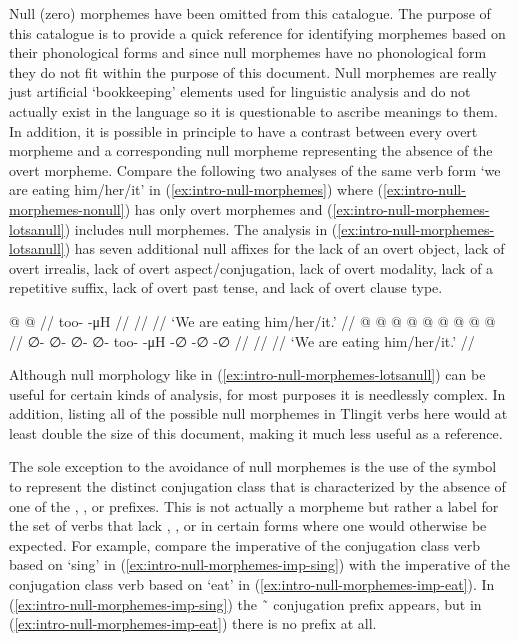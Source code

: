 Null (zero) morphemes have been omitted from this catalogue.
The purpose of this catalogue is to provide a quick reference for identifying morphemes based on their phonological forms and since null morphemes have no phonological form they do not fit within the purpose of this document.
Null morphemes are really just artificial ‘bookkeeping’ elements used for linguistic analysis and do not actually exist in the language so it is questionable to ascribe meanings to them.
In addition, it is possible in principle to have a contrast between every overt morpheme and a corresponding null morpheme representing the absence of the overt morpheme.
Compare the following two analyses of the same verb form  ‘we are eating him/her/it’ in (\ref{ex:intro-null-morphemes}) where (\ref{ex:intro-null-morphemes-nonull}) has only overt morphemes and (\ref{ex:intro-null-morphemes-lotsanull}) includes null morphemes.
The analysis in (\ref{ex:intro-null-morphemes-lotsanull}) has seven additional null affixes for the lack of an overt object, lack of overt irrealis, lack of overt aspect/conjugation, lack of overt modality, lack of a repetitive suffix, lack of overt past tense, and lack of overt clause type.

\pex\label{ex:intro-null-morphemes}%
\a\label{ex:intro-null-morphemes-nonull}%
\begingl
	\gla	{} @ {} @ {} //
	\glb	too-  -μH //
	\glc	{}\·  \· //
	\gld	{} {} {} //
	\glft	‘We are eating him/her/it.’
		//
\endgl
\a\label{ex:intro-null-morphemes-lotsanull}%
\begingl
	\gla	{} @ {} @ {} @ {} @ {} @ {} @ {} @ {} @ {} @ {} //
	\glb	∅- ∅- ∅- ∅- too-  -μH -∅ -∅ -∅ //
	\glc	{}\· \· \· \· \·
		 \· \· \· \· //
	\gld	{} {} {} {} {} {} {} {} {} {} //
	\glft	‘We are eating him/her/it.’
		//
\endgl
\xe

Although null morphology like in (\ref{ex:intro-null-morphemes-lotsanull}) can be useful for certain kinds of analysis, for most purposes it is needlessly complex.
In addition, listing all of the possible null morphemes in Tlingit verbs here would at least double the size of this document, making it much less useful as a reference.

The sole exception to the avoidance of null morphemes is the use of the symbol  to represent the distinct conjugation class that is characterized by the absence of one of the , , or  prefixes.
This  is not actually a morpheme but rather a label for the set of verbs that lack , , or  in certain forms where one would otherwise be expected.
For example, compare the imperative of the  conjugation class verb based on  ‘sing’ in (\ref{ex:intro-null-morphemes-imp-sing}) with the imperative of the  conjugation class verb based on  ‘eat’ in (\ref{ex:intro-null-morphemes-imp-eat}).
In (\ref{ex:intro-null-morphemes-imp-sing}) the  \~\  conjugation prefix appears, but in (\ref{ex:intro-null-morphemes-imp-eat}) there is no prefix at all.
 
